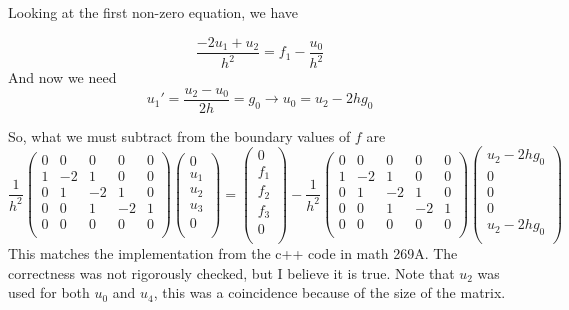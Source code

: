 \documentclass[11pt]{article}
\begin{document}
Looking at the first non-zero equation, we have

\begin{equation}
\frac{-2u_1+u_2}{h^2} = f_1 - \frac{u_0}{h^2}
\end{equation}
And now we need
\begin{equation}
	u_1' = \frac{u_2 - u_0}{2h} = g_0
	\longrightarrow
	u_0 = u_2 - 2hg_0
\end{equation}

So, what we must subtract from the boundary values of $f$ are
\begin{equation}
\frac{1}{h^2}
 \begin{pmatrix}
  0 &  0 &  0 &  0 &  0 \\
  1 & -2 &  1 &  0 &  0 \\
  0 &  1 & -2 &  1 &  0 \\
  0 &  0 &  1 & -2 &  1 \\
  0 &  0 &  0 &  0 &  0 \\
 \end{pmatrix}
 \begin{pmatrix}
  0 \\  u_1 \\  u_2 \\  u_3 \\  0 \\
 \end{pmatrix}
  =
 \begin{pmatrix}
  0 \\  f_1 \\  f_2 \\  f_3 \\  0 \\
 \end{pmatrix}
   -
\frac{1}{h^2}
 \begin{pmatrix}
  0 &  0 &  0 &  0 &  0 \\
  1 & -2 &  1 &  0 &  0 \\
  0 &  1 & -2 &  1 &  0 \\
  0 &  0 &  1 & -2 &  1 \\
  0 &  0 &  0 &  0 &  0 \\
 \end{pmatrix}
 \begin{pmatrix}
  u_2-2hg_0 \\  0 \\  0 \\  0 \\  u_2-2hg_0 \\
 \end{pmatrix}
\end{equation}
This matches the implementation from the c++ code in math 269A. The correctness was not rigorously checked, but I believe it is true. Note that $u_2$ was used for both $u_0$ and $u_4$, this was a coincidence because of the size of the matrix.
\end{document}

